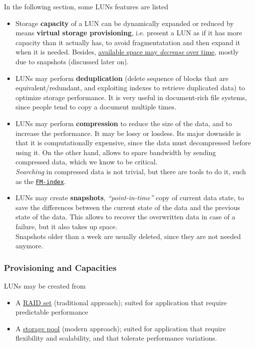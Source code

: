 In the following section, some LUNs features are listed
\begin{itemize}
   \item 
   Storage \textbf{capacity} of a LUN can be dynamically expanded or reduced
   by means \textbf{virtual storage provisioning}, i.e. present a LUN as if it has more capacity than it actually has, to avoid fragmentatation and then expand it when it is needed.
   Besides, \ul{available space may \textit{decrease} over time}, mostly due to snapshots (discussed later on).
   \item LUNs may perform \textbf{deduplication} (delete sequence of blocks that are equivalent/redundant, and exploiting indexes to retrieve duplicated data) to optimize storage performance. It is very useful in document-rich file systems, since people tend to copy a document multiple times.
   \item LUNs may perform \textbf{compression} to reduce the size of the data, and to increase the performance. It may be lossy or lossless.  Its major downside is that it is computationally expensive, since the data must decompressed before using it.
   On the other hand, allows to spare bandwidth by sending compressed data, which we know to be critical.\\
   \textit{Searching} in compressed data is not trivial, but there are tools to do it, such as the \href{https://en.wikipedia.org/wiki/FM-index}{\texttt{FM-index}}.
   \item LUNs may create \textbf{snapshots}, \textit{``point-in-time''} copy of current data state, to save the differences between the current state of the data and the previous state of the data. This allows to recover the overwritten data in case of a failure, but it also takes up space.\\
   Snapshots older than a week are usually deleted, since they are not needed anymore.
   
\end{itemize}

\subsubsection{Provisioning and Capacities}
LUNs may be created from\ns
\begin{itemize}
   \item A \ul{RAID set} (traditional approach); suited for application that require predictable performance
   \item A \ul{storage pool} (modern approach); suited for application that require flexibility and scalability, and that tolerate performance variations.
\end{itemize}


